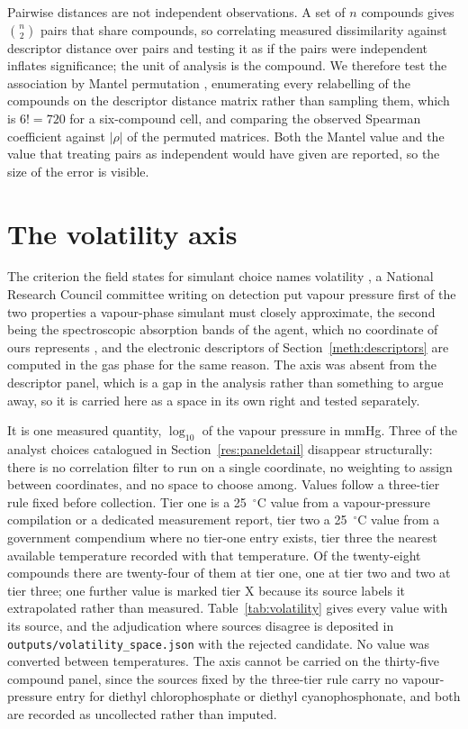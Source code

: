 \documentclass[11pt,a4paper]{article}
\begin{document}
Pairwise distances are not independent observations. A set of $n$ compounds
gives $\binom{n}{2}$ pairs that share compounds, so correlating measured
dissimilarity against descriptor distance over pairs and testing it as if the
pairs were independent inflates significance; the unit of analysis is the
compound. We therefore test the association by Mantel permutation
\cite{mantel1967}, enumerating every relabelling of the compounds on the
descriptor distance matrix rather than sampling them, which is $6! = 720$ for a
six-compound cell, and comparing the observed Spearman
coefficient against $|\rho|$ of the permuted matrices. Both the Mantel value and
the value that treating pairs as independent would have given are reported, so
the size of the error is visible.

\section{The volatility axis}
\label{meth:vol}

The criterion the field states for simulant choice names volatility
\cite{webb2025}, a National Research Council committee writing on detection put
vapour pressure first of the two properties a vapour-phase simulant must
closely approximate, the second being the spectroscopic absorption bands of the
agent, which no coordinate of ours represents \cite{nrc2003standoff}, and the
electronic descriptors of
Section~\ref{meth:descriptors} are computed in the gas phase for the same
reason. The axis was absent from the descriptor panel, which is a gap in the
analysis rather than something to argue away, so it is carried here as a space
in its own right and tested separately.

It is one measured quantity, $\log_{10}$ of the vapour pressure in mmHg. Three
of the analyst choices catalogued in Section~\ref{res:paneldetail} disappear
structurally: there is no correlation filter to run on a single coordinate, no
weighting to assign between coordinates, and no space to choose among. Values
follow a three-tier rule fixed before collection. Tier one is a
25~$^{\circ}$C value from a vapour-pressure compilation or a dedicated
measurement report, tier two a 25~$^{\circ}$C value from a government compendium
where no tier-one entry exists, tier three the nearest available temperature
recorded with that temperature. Of the twenty-eight compounds there are
twenty-four of them at tier one, one at tier two and two at tier three; one
further value is marked tier X because its source labels it extrapolated rather
than measured. Table~\ref{tab:volatility} gives every value with its source, and
the adjudication where sources disagree is deposited in
\texttt{outputs/volatility\_space.json} with the rejected candidate. No value was
converted between temperatures. The axis cannot be carried on the thirty-five
compound panel, since the sources fixed by the three-tier rule carry no
vapour-pressure entry for diethyl
chlorophosphate or diethyl cyanophosphonate, and both are recorded as
uncollected rather than imputed.
\end{document}
